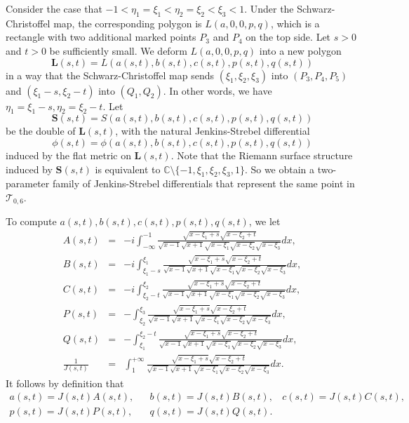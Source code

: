 \documentclass[11pt]{amsart}
\theoremstyle{plain}
\newcommand{\Tei}{\mathcal{T}}
\newcommand{\TS}{\mathbf{S}}
\newcommand{\TL}{\mathbf{L}}
\begin{document}
Consider the case that  $-1<\eta_1=\xi_1<\eta_2=\xi_2<\xi_3<1$. Under the Schwarz-Christoffel map,  the corresponding polygon is $L(a,0,0,p,q)$, which is a rectangle with two additional marked points $P_3$ and $P_4$ on the top side. Let $s>0$ and  $t>0$ be sufficiently small.
We deform $L(a,0,0,p,q)$ into a new polygon $$\mathbf{L}(s,t)=L\left(a(s,t),b(s,t),c(s,t),p(s,t),q(s,t)\right)$$ in a way that
the Schwarz-Christoffel map  
sends $(\xi_1, \xi_2, \xi_3)$ into $(P_3, P_4, P_5)$ and $(\xi_1-s, \xi_2-t)$ into $(Q_1, Q_2)$.  
In other words, we have $\eta_1=\xi_1-s, \eta_2=\xi_2-t$. Let $$\mathbf{S}(s,t)=S\left(a(s,t),b(s,t),c(s,t),p(s,t),q(s,t)\right)$$ be the double of $\TL(s,t)$, with the natural Jenkins-Strebel differential
$$\phi(s,t)=\phi\left(a(s,t),b(s,t),c(s,t),p(s,t),q(s,t)\right)$$
induced by the flat metric on $\TL(s,t)$.  
Note that the Riemann surface structure induced by $\TS(s,t)$ is  equivalent to  $\mathbb{C}\setminus
\{-1,\xi_1,\xi_2,\xi_3,1\}$.
So we obtain a  two-parameter family of Jenkins-Strebel differentials 
that represent the same point in $\Tei_{0,6}$. 

To compute $a(s,t), b(s,t), c(s,t), p(s,t), q(s,t)$, we let
\begin{eqnarray*}
A(s,t)&=&-i\int_{-\infty}^{-1}\frac{\sqrt{x-\xi_1+s}\sqrt{x-\xi_2+t}}{\sqrt{x-1}\sqrt{x+1}\sqrt{x-\xi_1}\sqrt{x-\xi_2}\sqrt{x-\xi_3}}dx,\\
B(s,t)&=&-i\int_{\xi_1-s}^{\xi_1}\frac{\sqrt{x-\xi_1+s}\sqrt{x-\xi_2+t}}{\sqrt{x-1}\sqrt{x+1}\sqrt{x-\xi_1}\sqrt{x-\xi_2}\sqrt{x-\xi_3}}dx,\\
C(s,t)&=&-i\int_{\xi_2-t}^{\xi_2}\frac{\sqrt{x-\xi_1+s}\sqrt{x-\xi_2+t}}{\sqrt{x-1}\sqrt{x+1}\sqrt{x-\xi_1}\sqrt{x-\xi_2}\sqrt{x-\xi_3}}dx,\\
P(s,t)&=&-\int_{\xi_2}^{\xi_3}\frac{\sqrt{x-\xi_1+s}\sqrt{x-\xi_2+t}}{\sqrt{x-1}\sqrt{x+1}\sqrt{x-\xi_1}\sqrt{x-\xi_2}\sqrt{x-\xi_3}}dx,\\
Q(s,t)&=&-\int_{\xi_1}^{\xi_2-t}\frac{\sqrt{x-\xi_1+s}\sqrt{x-\xi_2+t}}{\sqrt{x-1}\sqrt{x+1}\sqrt{x-\xi_1}\sqrt{x-\xi_2}\sqrt{x-\xi_3}}dx,\\
\frac{1}{J(s,t)}&=&\int_{1}^{+\infty}\frac{\sqrt{x-\xi_1+s}\sqrt{x-\xi_2+t}}{\sqrt{x-1}\sqrt{x+1}\sqrt{x-\xi_1}\sqrt{x-\xi_2}\sqrt{x-\xi_3}}dx.
\end{eqnarray*}
It follows by definition that
\begin{eqnarray*}
  a(s,t) = {J(s,t)}{A(s,t)}, && 
  b(s,t) = {J(s,t)}{B(s,t)}, \ \ \ \ 
  c(s,t) ={J(s,t)}{C(s,t)}, \\
 p(s,t) = {J(s,t)}{P(s,t)}, &&   q(s,t)  = {J(s,t)}{Q(s,t)}.\\
\end{eqnarray*}
\end{document}
